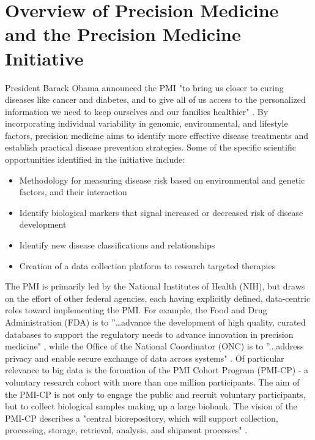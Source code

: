 \section{Overview of Precision Medicine and the Precision Medicine Initiative}

President Barack Obama announced the PMI "to bring us closer to curing diseases like cancer and diabetes, and to give all of 
us access to the personalized information we need to keep ourselves and our families healthier" \cite{obamaVid} 
\cite{Terry2015}. By incorporating individual variability in genomic, environmental, and lifestyle factors, precision 
medicine aims to identify more effective disease treatments and establish practical disease prevention strategies. Some of 
the specific scientific opportunities identified in the initiative include:

\begin{itemize}
  \item Methodology for measuring disease risk based on environmental and genetic factors, and their interaction
  \item Identify biological markers that signal increased or decreased risk of disease development
  \item Identify new disease classifications and relationships
  \item Creation of a data collection platform to research targeted therapies
\end{itemize}

The PMI is primarily led by the National Institutes of Health (NIH), but draws on the effort of other federal agencies, each 
having explicitly defined, data-centric roles toward implementing the PMI. For example, the Food and Drug Administration 
(FDA) is to ''…advance the development of high quality, curated databases to support the regulatory needs to advance 
innovation in precision medicine" \cite{Hudson2015}, while the Office of the National Coordinator (ONC) is to ''...address 
privacy and enable secure exchange of data across systems" \cite{Hudson2015}. Of particular relevance to big data is the 
formation of the PMI Cohort Program (PMI-CP) - a voluntary research cohort with more than one million participants. The aim 
of the PMI-CP is not only to engage the public and recruit voluntary participants, but to collect biological samples making 
up a large biobank. The vision of the PMI-CP describes a "central biorepository, which will support collection, processing, 
storage, retrieval, analysis, and shipment processes" \cite{Hudson2015}.

